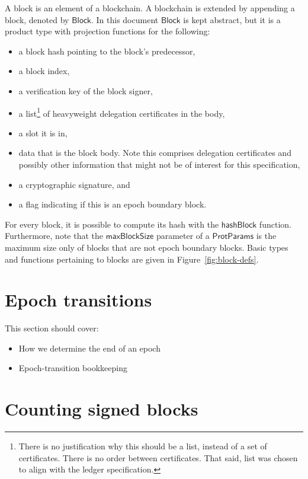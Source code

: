 \documentclass[11pt,a4paper]{article}
\newcommand{\fun}[1]{\mathsf{#1}}
\newcommand{\type}[1]{\mathsf{#1}}
\newcommand{\Block}{\type{Block}}
\newcommand{\ProtParams}{\type{ProtParams}} %
\newcommand{\hashofblockname}{hashBlock}
\newcommand{\maxblocksizename}{maxBlockSize}
\begin{document}
A block is an element of a blockchain.
%
A blockchain is extended by appending a block, denoted by $\Block$.
%
In this document $\Block$ is kept abstract, but it is a product type with
projection functions for the following:
%
\begin{itemize}
\item a block hash pointing to the block's predecessor,
\item a block index,
\item a verification key of the block signer,
\item a list\footnote{There is no justification why this should be a list,
    instead of a set of certificates. There is no order between
    certificates. That said, list was chosen to align with the ledger
    specification.} of heavyweight delegation certificates in the body,
\item a slot it is in,
\item data that is the block body. Note this comprises delegation certificates
  and possibly other information that might not be of interest for this
  specification,
\item a cryptographic signature, and
\item a flag indicating if this is an epoch boundary block.
\end{itemize}


For every block, it is possible to compute its hash with the
$\fun{\hashofblockname}$ function.
%
Furthermore, note that the $\fun{\maxblocksizename}$ parameter of a
$\ProtParams$ is the maximum size only of blocks that are not epoch boundary
blocks.
%
Basic types and functions pertaining to blocks are given in
Figure~\ref{fig:block-defs}.

\section{Epoch transitions}

This section should cover:
\begin{itemize}
\item How we determine the end of an epoch
\item Epoch-transition bookkeeping
\end{itemize}

\section{Counting signed blocks}

\newcommand{\BSCEnv}{\type{BSCEnv}}
\newcommand{\BSCState}{\type{BSCState}}
\end{document}
